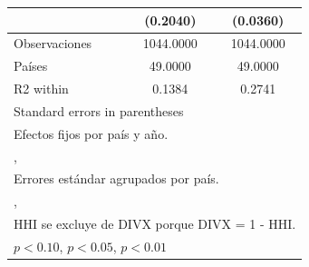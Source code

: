 {\begin{tabular}{l*{2}{c}}
                    &    (0.2040)         &    (0.0360)         \\
\midrule
Observaciones       &   1044.0000         &   1044.0000         \\
Países              &     49.0000         &     49.0000         \\
R2 within           &      0.1384         &      0.2741         \\
\bottomrule
\multicolumn{3}{l}{\footnotesize Standard errors in parentheses}\\
\multicolumn{3}{l}{\footnotesize Efectos fijos por país y año.}\\
\multicolumn{3}{l}{\footnotesize ,}\\
\multicolumn{3}{l}{\footnotesize Errores estándar agrupados por país.}\\
\multicolumn{3}{l}{\footnotesize ,}\\
\multicolumn{3}{l}{\footnotesize HHI se excluye de DIVX porque DIVX = 1 - HHI.}\\
\multicolumn{3}{l}{\footnotesize \sym{*} \(p<0.10\), \sym{**} \(p<0.05\), \sym{***} \(p<0.01\)}\\
\end{tabular}
}
